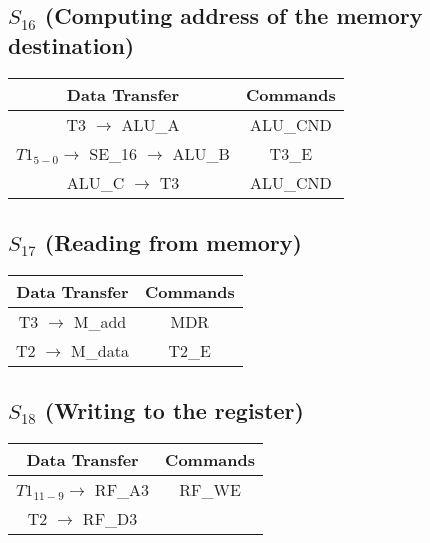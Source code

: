 \documentclass[]{article}
\begin{document}
        \subsection*{$S_{16}$ (Computing address of the memory destination)} %
        \begin{center}
            \begin{tabular}{|c|c|}
                \hline
                Data Transfer & Commands \\
                \hline
                T3 $\to$ ALU\_A & ALU\_CND\\
                $T1_{5-0} \to$ SE\_16 $\to$ ALU\_B & T3\_E\\
                ALU\_C $\to$ T3 & ALU\_CND\\ %
                \hline
            \end{tabular}
        \end{center}
        \subsection*{$S_{17}$ (Reading from memory)} %
        \begin{center}
            \begin{tabular}{|c|c|}
                \hline
                Data Transfer & Commands \\
                \hline
                T3 $\to$ M\_add & MDR\\
                T2 $\to$ M\_data & T2\_E\\
                \hline
            \end{tabular}
        \end{center}
        \subsection*{$S_{18}$ (Writing to the register)} %
            \begin{center}
                \begin{tabular}{|c|c|}
                    \hline
                    Data Transfer & Commands \\
                    \hline
                    $T1_{11-9} \to$ RF\_A3 & RF\_WE\\
                    T2 $\to$ RF\_D3 & \\
                    \hline
                \end{tabular}
            \end{center}
\end{document}
